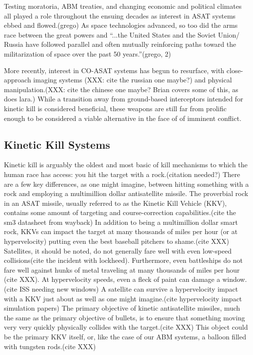 Testing moratoria, ABM treaties, and changing economic and political
climates all played a role throughout the ensuing decades as interest
in ASAT systems ebbed and flowed.(grego) As space technologies
advanced, so too did the arms race between the great powers and
``...the United States and the Soviet Union/ Russia have followed
parallel and often mutually reinforcing paths toward the
militarization of space over the past 50 years.''(grego, 2)

More recently, interest in CO-ASAT systems has begun to resurface,
with close-approach imaging systems (XXX: cite the russian one maybe?)
and physical manipulation.(XXX: cite the chinese one maybe?  Brian
covers some of this, as does lara.)  While a transition away from
ground-based interceptors intended for kinetic kill is considered
beneficial, these weapons are still far from prolific enough to be
considered a viable alternative in the face of of imminent conflict.

\subsection{Kinetic Kill Systems}

Kinetic kill is arguably the oldest and most basic of kill mechanisms
to which the human race has access: you hit the target with a
rock.(citation needed?)  There are a few key differences, as one might
imagine, between hitting something with a rock and employing a
multimillion dollar antisatellite missile.  The proverbial rock in an
ASAT missile, usually referred to as the Kinetic Kill Vehicle (KKV),
contains some amount of targeting and course-correction
capabilities.(cite the sm3 datasheet from wayback) In addition to
being a multimillion dollar smart rock, KKVs can impact the target at
many thousands of miles per hour (or at hypervelocity) putting even
the best baseball pitchers to shame.(cite XXX) Satellites, it should
be noted, do not generally fare well with even low-speed
collisions(cite the incident with lockheed).  Furthermore, even
battleships do not fare well against hunks of metal traveling at many
thousands of miles per hour (cite XXX).  At hypervelocity speeds, even
a fleck of paint can damage a window.(cite ISS needing new windows) A
satellite can survive a hypervelocity impact with a KKV just about as
well as one might imagine.(cite hypervelocity impact simulation
papers) The primary objective of kinetic antisatellite missiles, much
the same as the primary objective of bullets, is to ensure that
something moving very very quickly physically collides with the
target.(cite XXX) This object could be the primary KKV itself, or,
like the case of our ABM systems, a balloon filled with tungsten
rods.(cite XXX)

